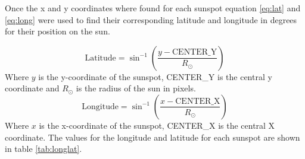 \documentclass[10pt]{article}
\begin{document}
\noindent Once the x and y coordinates where found for each sunspot equation \ref{eq:lat} and \ref{eq:long} were used to find their corresponding latitude and longitude in degrees for their position on the sun.

\begin{equation}
	\text{Latitude} = \sin^{-1} \left( \frac{y-\text{CENTER\_Y}}{R_{\odot}} \right)
	\label{eq:lat}
\end{equation}
Where $y$ is the y-coordinate of the sunspot, CENTER\_Y is the central y coordinate and $R_{\odot}$ is the radius of the sun in pixels.
\begin{equation}
	\text{Longitude} = \sin^{-1} \left( \frac{x-\text{CENTER\_X}}{R_{\odot}} \right)
	\label{eq:long}
\end{equation}
Where $x$ is the x-coordinate of the sunspot, CENTER\_X is the central X coordinate. The values for the longitude and latitude for each sunspot are shown in table \ref{tab:longlat}.
\end{document}
